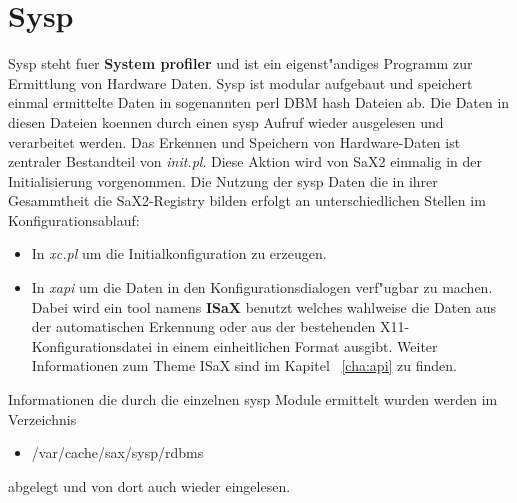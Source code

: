 \chapter{Sysp}
\label{cha:sys}
\minitoc

Sysp steht fuer \textbf{System profiler} und ist ein 
eigenst"andiges Programm zur Ermittlung von Hardware Daten.
Sysp ist modular aufgebaut und speichert einmal ermittelte
Daten in sogenannten perl DBM hash Dateien ab. Die Daten 
in diesen Dateien koennen durch einen sysp Aufruf wieder
ausgelesen und verarbeitet werden. Das Erkennen und Speichern von 
Hardware-Daten ist zentraler Bestandteil von \textit{init.pl}.
Diese Aktion wird von SaX2 einmalig in der Initialisierung 
vorgenommen. Die Nutzung der sysp Daten die in ihrer Gesammtheit
die SaX2-Registry bilden erfolgt an unterschiedlichen Stellen 
im Konfigurationsablauf:
\begin{itemize}
\item In \textit{xc.pl} um die Initialkonfiguration zu erzeugen.
\item In \textit{xapi} um die Daten in den Konfigurationsdialogen
      verf"ugbar zu machen. Dabei wird ein tool namens \textbf{ISaX}
      benutzt welches wahlweise die Daten aus der automatischen
      Erkennung oder aus der bestehenden X11-Konfigurationsdatei
      in einem einheitlichen Format ausgibt. Weiter Informationen
      zum Theme ISaX sind im Kapitel ~\ref{cha:api} zu finden.
\end{itemize} 
Informationen die durch die einzelnen sysp Module ermittelt wurden 
werden im Verzeichnis
\begin{itemize}
\item /var/cache/sax/sysp/rdbms
\end{itemize}
abgelegt und von dort auch wieder eingelesen. 

